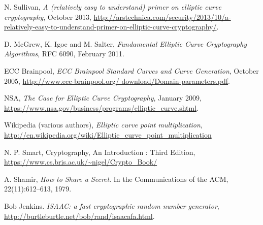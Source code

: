 \documentclass[ %
                    author={Nicholas Tutte},
                supervisor={Prof. Nigel Smart},
                    degree={MEng},
                     title={Secure Two Party Computation},
                  subtitle={A practical comparison of recent protocols},
                      type={Research - GG1K},
                      year={2015} ]{dissertation}
\begin{document}
\begin{thebibliography}{99}
			N. Sullivan,
			\emph{A (relatively easy to understand) primer on elliptic curve cryptography},
			October 2013,
			\url{http://arstechnica.com/security/2013/10/a-relatively-easy-to-understand-primer-on-elliptic-curve-cryptography/}.

			D. McGrew, K. Igoe and M. Salter,
			\emph{Fundamental Elliptic Curve Cryptography Algorithms},
			RFC 6090,
			February 2011.

			ECC Brainpool, \emph{ECC Brainpool Standard Curves and Curve Generation},
			October 2005, \url{http://www.ecc-brainpool.org/
			download/Domain-parameters.pdf}.

			NSA,
			\emph{The Case for Elliptic Curve Cryptography},
			January 2009,
			\url{https://www.nsa.gov/business/programs/elliptic_curve.shtml}.

			Wikipedia (various authors),
			\emph{Elliptic curve point multiplication},
			\url{http://en.wikipedia.org/wiki/Elliptic_curve_point_multiplication}

			N. P. Smart,
			Cryptography, An Introduction : Third Edition,
			\url{https://www.cs.bris.ac.uk/~nigel/Crypto_Book/}
		
			A. Shamir,
			\emph{How to Share a Secret}.
			In the Communications of the ACM,
			22(11):612–613,
			1979.

			Bob Jenkins. \emph{ISAAC: a fast cryptographic random number generator},
			\url{http://burtleburtle.net/bob/rand/isaacafa.html}.

	\end{thebibliography}
\end{document}
